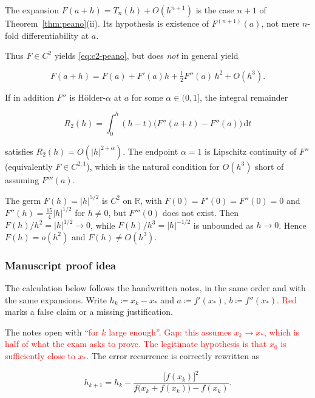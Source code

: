 \documentclass[11pt,a4paper]{article}
\newcommand{\mserr}[1]{\textcolor{red}{#1}}
\begin{document}
\begin{corollary}
\label{cor:peano-not-onplus1}
The expansion \(F(a+h)=T_{n}(h)+O(h^{n+1})\) is the case \(n+1\) of Theorem~\ref{thm:peano}(ii). Its hypothesis is existence of \(F^{(n+1)}(a)\), not mere \(n\)-fold differentiability at \(a\).

Thus \(F\in C^{2}\) yields \eqref{eq:c2-peano}, but does \emph{not} in general yield

\[
F(a+h)
=
F(a)+F'(a)h+\tfrac12 F''(a)\,h^{2}+O(h^{3}).
\]

If in addition \(F''\) is Hölder-\(\alpha\) at \(a\) for some \(\alpha\in(0,1]\), the integral remainder

\[
R_{2}(h)
=
\int_{0}^{h}(h-t)\bigl(F''(a+t)-F''(a)\bigr)\,\mathrm{d}t
\]

satisfies \(R_{2}(h)=O(|h|^{2+\alpha})\). The endpoint \(\alpha=1\) is Lipschitz continuity of \(F''\) (equivalently \(F\in C^{2,1}\)), which is the natural condition for \(O(h^{3})\) short of assuming \(F'''(a)\).
\end{corollary}

\begin{example}
\label{ex:c2-not-O3}
The germ \(F(h)=|h|^{5/2}\) is \(C^{2}\) on \(\mathbb{R}\), with \(F(0)=F'(0)=F''(0)=0\) and \(F''(h)=\frac{15}{4}|h|^{1/2}\) for \(h\neq 0\), but \(F'''(0)\) does not exist. Then \(F(h)/h^{2}=|h|^{1/2}\to 0\), while \(F(h)/h^{3}=|h|^{-1/2}\) is unbounded as \(h\to 0\). Hence \(F(h)=o(h^{2})\) and \(F(h)\neq O(h^{3})\).
\end{example}

\subsubsection{Manuscript proof idea}

The calculation below follows the handwritten notes, in the same order and with the same expansions. Write \(h_{k}\coloneqq x_{k}-x_{*}\) and \(a\coloneqq f'(x_{*})\), \(b\coloneqq f''(x_{*})\). \mserr{Red} marks a false claim or a missing justification.

The notes open with \mserr{``for \(k\) large enough''}. \mserr{Gap: this assumes \(x_{k}\to x_{*}\), which is half of what the exam asks to prove. The legitimate hypothesis is that \(x_{0}\) is sufficiently close to \(x_{*}\).} The error recurrence is correctly rewritten as

\[
h_{k+1}
=
h_{k}
-
\frac{\bigl[f(x_{k})\bigr]^{2}}{f\bigl(x_{k}+f(x_{k})\bigr)-f(x_{k})}.
\]
\end{document}
